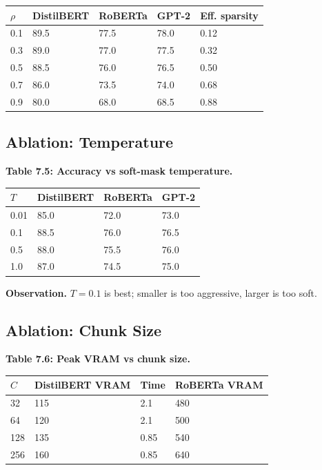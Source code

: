 \begin{table}[H]
\centering
\small
\begin{tabular}{lllll}
\toprule
\textbf{$\rho$} & \textbf{DistilBERT} & \textbf{RoBERTa} & \textbf{GPT-2} & \textbf{Eff. sparsity} \\
\midrule
0.1 & 89.5 & 77.5 & 78.0 & 0.12 \\
0.3 & 89.0 & 77.0 & 77.5 & 0.32 \\
0.5 & 88.5 & 76.0 & 76.5 & 0.50 \\
0.7 & 86.0 & 73.5 & 74.0 & 0.68 \\
0.9 & 80.0 & 68.0 & 68.5 & 0.88 \\
\bottomrule
\end{tabular}
\end{table}

\subsection{Ablation: Temperature}

\textbf{Table 7.5: Accuracy vs soft-mask temperature.}

\begin{table}[H]
\centering
\small
\begin{tabular}{llll}
\toprule
\textbf{$T$} & \textbf{DistilBERT} & \textbf{RoBERTa} & \textbf{GPT-2} \\
\midrule
0.01 & 85.0 & 72.0 & 73.0 \\
0.1 & 88.5 & 76.0 & 76.5 \\
0.5 & 88.0 & 75.5 & 76.0 \\
1.0 & 87.0 & 74.5 & 75.0 \\
\bottomrule
\end{tabular}
\end{table}

\textbf{Observation.} $T = 0.1$ is best; smaller is too aggressive, 
larger is too soft.

\subsection{Ablation: Chunk Size}

\textbf{Table 7.6: Peak VRAM vs chunk size.}

\begin{table}[H]
\centering
\small
\begin{tabular}{llll}
\toprule
\textbf{$C$} & \textbf{DistilBERT VRAM} & \textbf{Time} & \textbf{RoBERTa VRAM} \\
\midrule
32 & 115 & 2.1 & 480 \\
64 & 120 & 2.1 & 500 \\
128 & 135 & 0.85 & 540 \\
256 & 160 & 0.85 & 640 \\
\bottomrule
\end{tabular}
\end{table}

